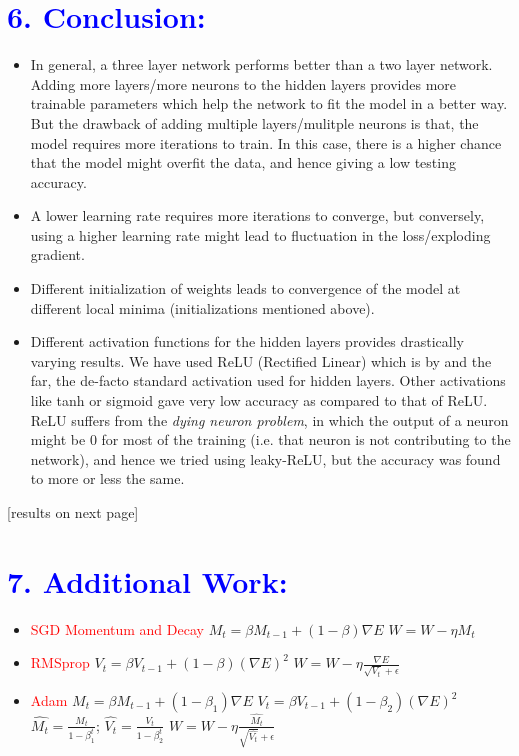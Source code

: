 \documentclass[a4paper,10pt,twoside]{article}
\begin{document}
\section*{\textcolor{blue}{6. Conclusion:}}
\begin{itemize}
\item{In general, a three layer network performs better than a two layer network. Adding more layers/more neurons to the hidden layers provides more trainable parameters which help the network to fit the model in a better way. But the drawback of adding multiple layers/mulitple neurons is that, the model requires more iterations to train. In this case, there is a higher chance that the model might overfit the data, and hence giving a low testing accuracy.}
\item{A lower learning rate requires more iterations to converge, but conversely, using a higher learning rate might lead to fluctuation in the loss/exploding gradient.}
\item{Different initialization of weights leads to convergence of the model at different local minima (initializations mentioned above).}
\item{Different activation functions for the hidden layers provides drastically varying results. We	 have used ReLU (Rectified Linear) which is by and the far, the de-facto standard activation used for hidden layers. Other activations like tanh or sigmoid gave very low accuracy as compared to that of ReLU. ReLU suffers from the \emph{dying neuron problem}, in which the output of a neuron might be 0 for most of the training (i.e. that neuron is not contributing to the network), and hence we tried using leaky-ReLU, but the accuracy was found to more or less the same.}
\end{itemize}
[results on next page]

\section*{\textcolor{blue}{7. Additional Work:}}
\begin{itemize}
\item{\textcolor{red}{SGD Momentum and Decay}
\newline				
$M_t = \beta M_{t-1} + (1 - \beta)\nabla E$
\newline
$W = W - \eta M_t$
}
\item{\textcolor{red}{RMSprop}
\newline
$V_t = \beta V_{t-1} + (1 - \beta)(\nabla E)^2$
\newline
$W = W - \eta \frac{\nabla E}{\sqrt{V_t} + \epsilon}$
}
\item{\textcolor{red}{Adam}
\newline
$M_t = \beta M_{t-1} + (1 - \beta_1)\nabla E$
\newline
$V_t = \beta V_{t-1} + (1 - \beta_2)(\nabla E)^2$
\newline
$\hat{M_t} = \frac{M_t}{1 - \beta_1^t}$; $\hat{V_t} = \frac{V_t}{1 - \beta_2^t}$
\newline
$W = W - \eta \frac{\hat{M_t}}{\sqrt{\hat{V_t}} + \epsilon}$
}
\end{itemize}
\end{document}
